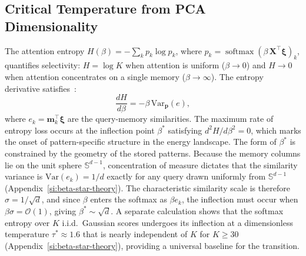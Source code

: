 \subsection{Critical Temperature from PCA Dimensionality}\label{sec:beta-star}
The attention entropy $H(\beta) = -\sum_k p_k \log p_k$, where $p_k = \operatorname{softmax}(\beta\,\mathbf{X}^\top\boldsymbol{\xi})_k$, quantifies selectivity: $H = \log K$ when attention is uniform ($\beta \to 0$) and $H \to 0$ when attention concentrates on a single memory ($\beta \to \infty$). The entropy derivative satisfies~\cite{alswaidanVarnerStochasticAttention2026}:
\begin{equation}\label{eq:entropy-deriv}
    \frac{dH}{d\beta} = -\beta\,\mathrm{Var}_{\mathbf{p}}(e),
\end{equation}
where $e_k = \mathbf{m}_k^\top\boldsymbol{\xi}$ are the query-memory similarities. The maximum rate of entropy loss occurs at the inflection point $\beta^*$ satisfying $d^2H/d\beta^2 = 0$, which marks the onset of pattern-specific structure in the energy landscape. The form of $\beta^*$ is constrained by the geometry of the stored patterns. Because the memory columns lie on the unit sphere $\mathbb{S}^{d-1}$, concentration of measure dictates that the similarity variance is $\mathrm{Var}(e_k) = 1/d$ exactly for any query drawn uniformly from $\mathbb{S}^{d-1}$ (Appendix~\ref{si:beta-star-theory}). The characteristic similarity scale is therefore $\sigma = 1/\sqrt{d}$, and since $\beta$ enters the softmax as $\beta e_k$, the inflection must occur when $\beta\sigma = \mathcal{O}(1)$, giving $\beta^* \sim \sqrt{d}$. A separate calculation shows that the softmax entropy over $K$ i.i.d.\ Gaussian scores undergoes its inflection at a dimensionless temperature $\tau^* \approx 1.6$ that is nearly independent of $K$ for $K \geq 30$ (Appendix~\ref{si:beta-star-theory}), providing a universal baseline for the transition.

